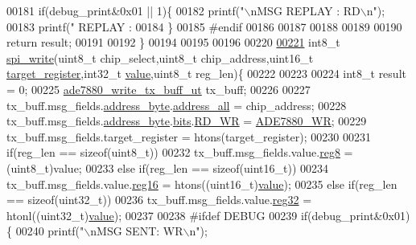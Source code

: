 \begin{DoxyCode}
{{{00181 \textcolor{preprocessor}{}     \textcolor{keywordflow}{if}(debug\_print&0x01 || 1)\{
00182        printf(\textcolor{stringliteral}{"\(\backslash\)nMSG REPLAY : RD\(\backslash\)n"});
00183        printf(\textcolor{stringliteral}{"        REPLAY :%
00184      \}  
00185 \textcolor{preprocessor}{    #endif}
00186 \textcolor{preprocessor}{}    
00187     
00188 
00189 
00190     \textcolor{keywordflow}{return} result;
00191     
00192 \}
00194    
00195 
00196 
00220 
\hypertarget{a00040_source_l00221}{}\hyperlink{a00007_ga2770219ad8ad1eda1817c0df934b47d0}{00221} int8\_t \hyperlink{a00007_ga2770219ad8ad1eda1817c0df934b47d0}{spi\_write}(uint8\_t chip\_select,uint8\_t chip\_address,uint16\_t 
      \hyperlink{a00041_ac02048009fa6718e40f028b6bae63f3d}{target\_register},int32\_t \hyperlink{a00041_a638e4503e0ae6ce655b7ad2e17e8f0ad}{value},uint8\_t reg\_len)\{
00222       
00223       
00224     int8\_t result = 0;  
00225     \hyperlink{a00020}{ade7880\_write\_tx\_buff\_ut}  tx\_buff;
00226 
00227      tx\_buff.msg\_fields.\hyperlink{a00020_af6a65bac733ea3e9b1d24b065163d49a}{address\_byte}.\hyperlink{a00011_a7bf6defa0ae3fb2bca057a3a97d4f740}{address\_all} = chip\_address;
00228      tx\_buff.msg\_fields.\hyperlink{a00020_af6a65bac733ea3e9b1d24b065163d49a}{address\_byte}.\hyperlink{a00011_ae121725fb28cc26495969d71e0e0d42e}{bits}.\hyperlink{a00011_a97e2668c8e5470fa66185f16dc2e8045}{RD\_WR} = 
      \hyperlink{a00041_a36352e0d88dc7c5ede031013c75a678f}{ADE7880\_WR};
00229      tx\_buff.msg\_fields.target\_register = htons(target\_register);
00230      
00231     \textcolor{keywordflow}{if}(reg\_len == \textcolor{keyword}{sizeof}(uint8\_t))
00232       tx\_buff.msg\_fields.value.\hyperlink{a00020_a90b3f782e917edca7101e7803a3773b7}{reg8}  = (uint8\_t)value;
00233     \textcolor{keywordflow}{else} \textcolor{keywordflow}{if}(reg\_len == \textcolor{keyword}{sizeof}(uint16\_t))
00234       tx\_buff.msg\_fields.value.\hyperlink{a00020_a0c22d234d52e616d449a8c264bf2030b}{reg16} = htons((uint16\_t)\hyperlink{a00041_a638e4503e0ae6ce655b7ad2e17e8f0ad}{value});
00235     \textcolor{keywordflow}{else} \textcolor{keywordflow}{if}(reg\_len == \textcolor{keyword}{sizeof}(uint32\_t))
00236       tx\_buff.msg\_fields.value.\hyperlink{a00020_a83e2be8d3feb1bcbc286bfaae10ac552}{reg32} = htonl((uint32\_t)\hyperlink{a00041_a638e4503e0ae6ce655b7ad2e17e8f0ad}{value});
00237     
00238 \textcolor{preprocessor}{    #ifdef DEBUG}
00239 \textcolor{preprocessor}{}      \textcolor{keywordflow}{if}(debug\_print&0x01)\{
00240        printf(\textcolor{stringliteral}{"\(\backslash\)nMSG SENT: WR\(\backslash\)n"});
}}}}
\end{DoxyCode}
